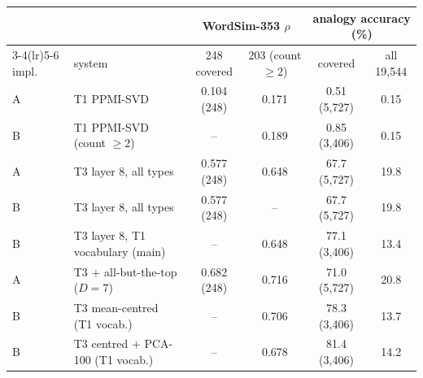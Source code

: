 \begin{tabular}{llcccc}
\toprule
 & & \multicolumn{2}{c}{WordSim-353 $\rho$} & \multicolumn{2}{c}{analogy accuracy (\%)} \\
\cmidrule(lr){3-4}\cmidrule(lr){5-6}
impl. & system & 248 covered & 203 (count $\ge$2) & covered & all 19,544 \\
\midrule
A & T1 PPMI-SVD & 0.104 (248) & 0.171 & 0.51 (5,727) & 0.15 \\
B & T1 PPMI-SVD (count $\ge$2) & -- & 0.189 & 0.85 (3,406) & 0.15 \\
\midrule A & T3 layer 8, all types & 0.577 (248) & 0.648 & 67.7 (5,727) & 19.8 \\
B & T3 layer 8, all types & 0.577 (248) & -- & 67.7 (5,727) & 19.8 \\
B & T3 layer 8, T1 vocabulary (main) & -- & 0.648 & 77.1 (3,406) & 13.4 \\
\midrule A & T3 + all-but-the-top ($D{=}7$) & 0.682 (248) & 0.716 & 71.0 (5,727) & 20.8 \\
B & T3 mean-centred (T1 vocab.) & -- & 0.706 & 78.3 (3,406) & 13.7 \\
B & T3 centred + PCA-100 (T1 vocab.) & -- & 0.678 & 81.4 (3,406) & 14.2 \\
\bottomrule
\end{tabular}
